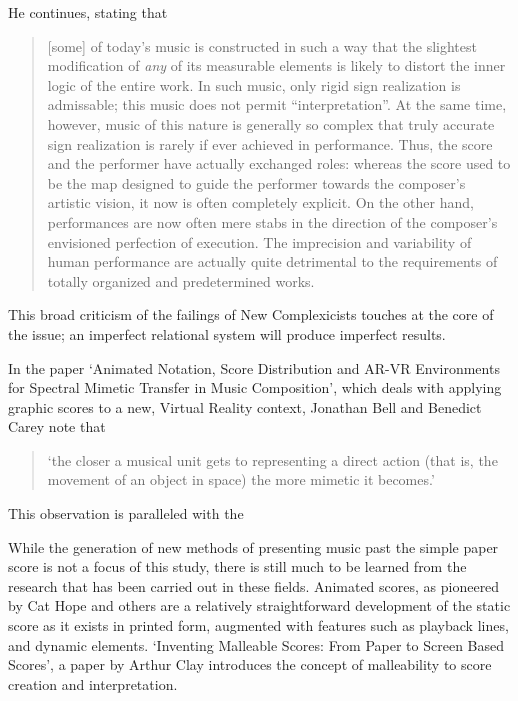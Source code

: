 He continues, stating that \begin{quotation}
    [some] of today's music is constructed in such a way that the slightest modification of \emph{any} of its measurable elements is likely to distort the inner logic of the entire work.
    In such music, only rigid sign realization is admissable; this music does not permit ``interpretation''. 
    At the same time, however, music of this nature is generally so complex that truly accurate sign realization is rarely if ever achieved in performance.
    Thus, the score and the performer have actually exchanged roles: whereas the score used to be the map designed to guide the performer towards the composer's artistic vision, it now is often completely explicit.
    On the other hand, performances are now often mere stabs in the direction of the composer's envisioned perfection of execution.
    The imprecision and variability of human performance are actually quite detrimental to the requirements of totally organized and predetermined works.\autocite[30--31]{stoneProblemsMethodsNotation1963}
\end{quotation}

This broad criticism of the failings of New Complexicists touches at the core of the issue; an imperfect relational system will produce imperfect results.

In the paper `Animated Notation, Score Distribution and AR-VR Environments for Spectral Mimetic Transfer in Music Composition', which deals with applying graphic scores to a new, Virtual Reality context, Jonathan Bell and Benedict Carey note that \begin{quotation}
    `the closer a musical unit gets to representing a direct action (that is, the movement of an object in space) the more mimetic it becomes.'\autocite[]{bellANIMATEDNOTATIONSCORE2019}
\end{quotation} This observation is paralleled with the 

While the generation of new methods of presenting music past the simple paper score is not a focus of this study, there is still much to be learned from the research that has been carried out in these fields.
Animated scores, as pioneered by Cat Hope and others are a relatively straightforward development of the static score as it exists in printed form, augmented with features such as playback lines, and dynamic elements.
`Inventing Malleable Scores: From Paper to Screen Based Scores', a paper by Arthur Clay introduces the concept of malleability to score creation and interpretation.

